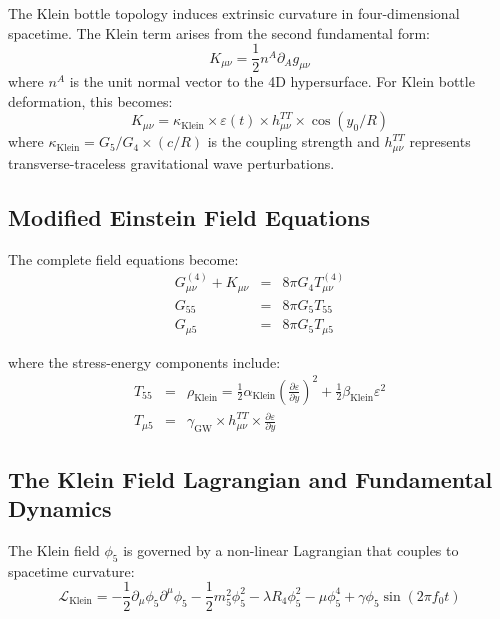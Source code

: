\documentclass[12pt]{iopart}
\newcommand{\phifive}{\phi_5}
\newcommand{\fzero}{f_0}
\newcommand{\Rfour}{R_4}
\begin{document}
The Klein bottle topology induces extrinsic curvature in four-dimensional spacetime. The Klein term arises from the second fundamental form:
\begin{equation}
K_{\mu\nu} = \frac{1}{2} n^A \partial_A g_{\mu\nu}
\label{eq:klein_term}
\end{equation}
where $n^A$ is the unit normal vector to the 4D hypersurface. For Klein bottle deformation, this becomes:
\begin{equation}
K_{\mu\nu} = \kappa_{\text{Klein}} \times \varepsilon(t) \times h_{\mu\nu}^{TT} \times \cos(y_0/R)
\label{eq:klein_explicit}
\end{equation}
where $\kappa_{\text{Klein}} = G_5/G_4 \times (c/R)$ is the coupling strength and $h_{\mu\nu}^{TT}$ represents transverse-traceless gravitational wave perturbations.

\subsection{Modified Einstein Field Equations}

The complete field equations become:
\begin{eqnarray}
G_{\mu\nu}^{(4)} + K_{\mu\nu} &=& 8\pi G_4 T_{\mu\nu}^{(4)} \label{eq:4d_modified}\\
G_{55} &=& 8\pi G_5 T_{55} \label{eq:5d_pure}\\
G_{\mu 5} &=& 8\pi G_5 T_{\mu 5} \label{eq:mixed_coupling}
\end{eqnarray}

where the stress-energy components include:
\begin{eqnarray}
T_{55} &=& \rho_{\text{Klein}} = \frac{1}{2}\alpha_{\text{Klein}}\left(\frac{\partial\varepsilon}{\partial y}\right)^2 + \frac{1}{2}\beta_{\text{Klein}}\varepsilon^2 \\
T_{\mu 5} &=& \gamma_{\text{GW}} \times h_{\mu\nu}^{TT} \times \frac{\partial\varepsilon}{\partial y}
\end{eqnarray}

\subsection{The Klein Field Lagrangian and Fundamental Dynamics}

The Klein field $\phifive$ is governed by a non-linear Lagrangian that couples to spacetime curvature:
\begin{equation}
\mathcal{L}_{\text{Klein}} = -\frac{1}{2} \partial_\mu\phifive \partial^\mu\phifive - \frac{1}{2}m_5^2\phifive^2 - \lambda\Rfour\phifive^2 - \mu\phifive^4 + \gamma\phifive \sin(2\pi\fzero t)
\label{eq:klein_lagrangian}
\end{equation}
\end{document}
